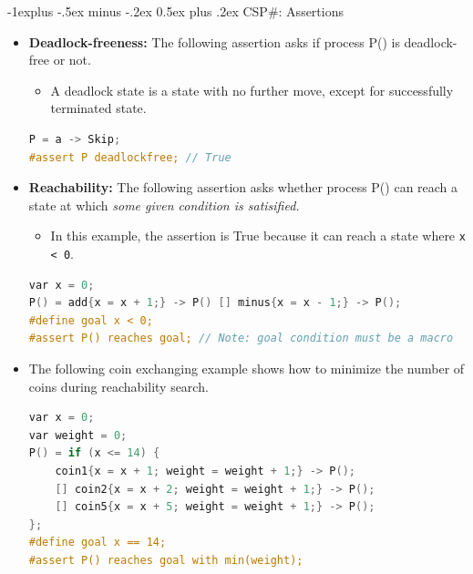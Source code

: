 \documentclass[10pt, landscape]{article}
\makeatletter
\renewcommand{\subsection}{\@startsection{subsection}{2}{0mm}%
  {-1explus -.5ex minus -.2ex}%
  {0.5ex plus .2ex}%
{\normalfont\normalsize\bfseries}}
\makeatother
\begin{document}
\begin{multicols*}{3}
  \subsection{CSP\#: Assertions}
  \begin{itemize}
    \item \textbf{Deadlock-freeness:} The following assertion asks if process P() is deadlock-free or not.
    \begin{itemize}
        \item A deadlock state is a state with no further move, except for successfully terminated state.
    \end{itemize}
\begin{lstlisting}[language=C]
P = a -> Skip;
#assert P deadlockfree; // True
\end{lstlisting}
  \item \textbf{Reachability:} The following assertion asks whether process P() can reach a state at which \textit{some given condition is satisified.}
  \begin{itemize}
    \item In this example, the assertion is True because it can reach a state where \texttt{x < 0}.
  \end{itemize}
\begin{lstlisting}[language=C]
var x = 0;
P() = add{x = x + 1;} -> P() [] minus{x = x - 1;} -> P();
#define goal x < 0;
#assert P() reaches goal; // Note: goal condition must be a macro
\end{lstlisting}
  \item The following coin exchanging example shows how to minimize the number of coins during reachability search.
\begin{lstlisting}[language=C]
var x = 0;
var weight = 0;
P() = if (x <= 14) {
    coin1{x = x + 1; weight = weight + 1;} -> P();
    [] coin2{x = x + 2; weight = weight + 1;} -> P();
    [] coin5{x = x + 5; weight = weight + 1;} -> P();
};
#define goal x == 14;
#assert P() reaches goal with min(weight);
\end{lstlisting}
  \end{itemize}
  

\end{multicols*}
\end{document}
